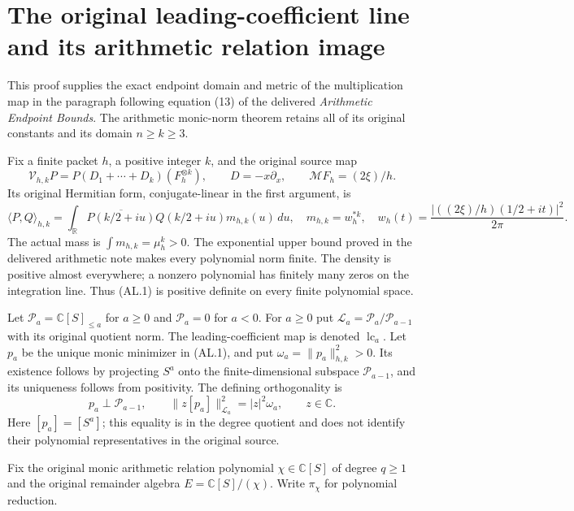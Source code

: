 \begingroup
\def\calP{\mathcal P}
\def\calL{\mathcal L}
\section{The original leading-coefficient line and its arithmetic relation image}



This proof supplies the exact endpoint domain and metric of the multiplication
map in the paragraph following equation (13) of the delivered \emph{Arithmetic
Endpoint Bounds}. The arithmetic monic-norm theorem retains all of its original
constants and its domain $n\ge k\ge3$.

Fix a finite packet $h$, a positive integer $k$, and the original source map
\[
 \mathcal V_{h,k}P=P(D_1+\cdots+D_k)(F_h^{\otimes k}),\qquad
 D=-x\partial_x,\qquad \mathcal MF_h=(2\xi)/h.
\]
Its original Hermitian form, conjugate-linear in the first argument, is
\begin{equation}\tag{AL.1}
 \langle P,Q\rangle_{h,k}
 =\int_{\mathbb R}\overline{P(k/2+iu)}Q(k/2+iu)
    m_{h,k}(u)\,du,\quad
 m_{h,k}=w_h^{*k},\quad
 w_h(t)=\frac{|((2\xi)/h)(1/2+it)|^2}{2\pi}.
\end{equation}
The actual mass is $\int m_{h,k}=\mu_h^k>0$. The exponential upper bound
proved in the delivered arithmetic note makes every polynomial norm finite.
The density is positive almost everywhere; a nonzero polynomial has finitely
many zeros on the integration line. Thus (AL.1) is positive definite on every
finite polynomial space.

Let $\calP_a=\mathbb C[S]_{\le a}$ for $a\ge0$ and $\calP_a=0$ for $a<0$.
For $a\ge0$ put $\calL_a=\calP_a/\calP_{a-1}$ with its original quotient
norm. The leading-coefficient map is denoted $\operatorname{lc}_a$.
Let $p_a$ be the unique monic minimizer in (AL.1), and put
$\omega_a=\|p_a\|_{h,k}^2>0$. Its existence follows by projecting $S^a$
onto the finite-dimensional subspace $\calP_{a-1}$, and its uniqueness follows
from positivity. The defining orthogonality is
\begin{equation}\tag{AL.2}
 p_a\perp\calP_{a-1},\qquad
 \|z[p_a]\|_{\calL_a}^2=|z|^2\omega_a,\qquad z\in\mathbb C.
\end{equation}
Here $[p_a]=[S^a]$; this equality is in the degree quotient and does not identify
their polynomial representatives in the original source.

Fix the original monic arithmetic relation polynomial $\chi\in\mathbb C[S]$
of degree $q\ge1$ and the original remainder algebra
$E=\mathbb C[S]/(\chi)$. Write $\pi_\chi$ for polynomial reduction.

